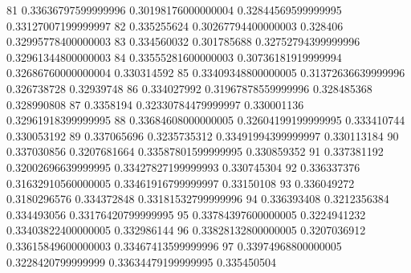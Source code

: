 81 0.33636797599999996 0.30198176000000004 0.32844569599999995 0.33127007199999997
82 0.335255624 0.30267794400000003 0.328406 0.32995778400000003
83 0.334560032 0.301785688 0.32752794399999996 0.32961344800000003
84 0.33555281600000003 0.30736181919999994 0.32686760000000004 0.330314592
85 0.33409348800000005 0.31372636639999996 0.326738728 0.32939748
86 0.334027992 0.31967878559999996 0.328485368 0.328990808
87 0.3358194 0.32330784479999997 0.330001136 0.32961918399999995
88 0.33684608000000005 0.32604199199999995 0.333410744 0.330053192
89 0.337065696 0.3235735312 0.33491994399999997 0.330113184
90 0.337030856 0.3207681664 0.33587801599999995 0.330859352
91 0.337381192 0.32002696639999995 0.33427827199999993 0.330745304
92 0.336337376 0.31632910560000005 0.33461916799999997 0.33150108
93 0.336049272 0.3180296576 0.334372848 0.33181532799999996
94 0.336393408 0.3212356384 0.334493056 0.33176420799999995
95 0.33784397600000005 0.3224941232 0.33403822400000005 0.332986144
96 0.33828132800000005 0.3207036912 0.33615849600000003 0.33467413599999996
97 0.33974968800000005 0.3228420799999999 0.33634479199999995 0.335450504
